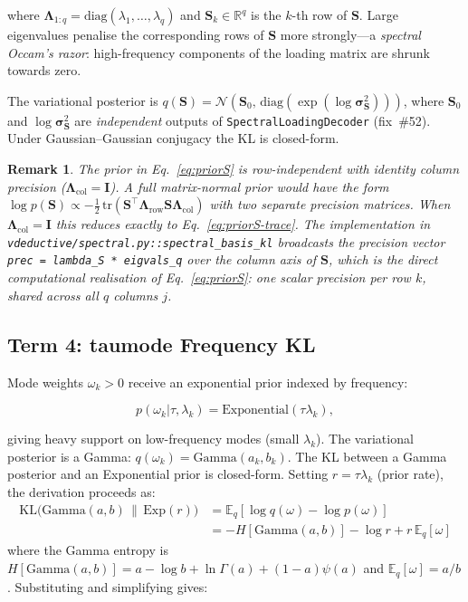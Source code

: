 \documentclass[11pt,a4paper]{article}
\newtheorem{remark}{Remark}
\newcommand{\Smat}{\mathbf{S}}
\newcommand{\normal}{\mathcal{N}}
\newcommand{\R}{\mathbb{R}}
\newcommand{\T}{^{\intercal}}
\begin{document}
where $\boldsymbol{\Lambda}_{1:q}=\mathrm{diag}(\lambda_1,\ldots,\lambda_q)$
and $\Smat_k\in\R^q$ is the $k$-th row of $\Smat$.
Large eigenvalues penalise the corresponding rows of $\Smat$ more
strongly---a \emph{spectral Occam's razor}: high-frequency components
of the loading matrix are shrunk towards zero.

The variational posterior is
$q(\Smat)=\normal\!\left(\Smat_0,\,\mathrm{diag}(\exp(\log\boldsymbol{\sigma}^2_{\Smat}))\right)$,
where $\Smat_0$ and $\log\boldsymbol{\sigma}^2_{\Smat}$ are \emph{independent}
outputs of \texttt{SpectralLoadingDecoder} (fix~\#52).
Under Gaussian--Gaussian conjugacy the KL is closed-form.

\begin{remark}\label{rem:prior-independence}
The prior in Eq.~\eqref{eq:priorS} is \emph{row-independent with identity
column precision} ($\boldsymbol{\Lambda}_{\text{col}} = \mathbf{I}$).
A full \emph{matrix-normal} prior would have the form
$\log p(\Smat)\propto -\tfrac{1}{2}\,\mathrm{tr}(\Smat\T\boldsymbol{\Lambda}_{\text{row}}\Smat\boldsymbol{\Lambda}_{\text{col}})$
with two separate precision matrices.
When $\boldsymbol{\Lambda}_{\text{col}} = \mathbf{I}$ this reduces exactly to
Eq.~\eqref{eq:priorS-trace}.
The implementation in \texttt{vdeductive/spectral.py::spectral\_basis\_kl} broadcasts
the precision vector \texttt{prec = lambda\_S * eigvals\_q} over the column
axis of $\Smat$, which is the direct computational realisation of
Eq.~\eqref{eq:priorS}: one scalar precision per row $k$, shared across
all $q$ columns $j$.
\end{remark}

\subsection{Term 4: taumode Frequency KL}
\label{sec:elbo:kltau}

Mode weights $\omega_k>0$ receive an exponential prior indexed by frequency:

\begin{equation}
  p(\omega_k|\tau,\lambda_k) = \mathrm{Exponential}(\tau\lambda_k),
  \label{eq:prioromega}
\end{equation}

giving heavy support on low-frequency modes (small $\lambda_k$).
The variational posterior is a Gamma: $q(\omega_k)=\mathrm{Gamma}(a_k,b_k)$.
The KL between a Gamma posterior and an Exponential prior is closed-form.
Setting $r = \tau\lambda_k$ (prior rate), the derivation proceeds as:
\begin{align*}
  \mathrm{KL}\bigl(\mathrm{Gamma}(a,b)\,\|\,\mathrm{Exp}(r)\bigr)
  &= \mathbb{E}_q[\log q(\omega) - \log p(\omega)] \\
  &= -H[\mathrm{Gamma}(a,b)] - \log r + r\,\mathbb{E}_q[\omega]
\end{align*}
where the Gamma entropy is
$H[\mathrm{Gamma}(a,b)] = a - \log b + \ln\Gamma(a) + (1-a)\psi(a)$
and $\mathbb{E}_q[\omega] = a/b$.  Substituting and simplifying gives:
\end{document}
